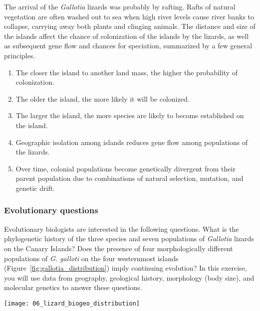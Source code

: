 \documentclass[12pt, hidelinks]{exam}
\begin{document}
The arrival of the \emph{Gallotia} lizards was probably by rafting. Rafts of natural vegetation are often
washed out to sea when high river levels cause river banks to collapse,
carrying away both plants and clinging animals. The distance and size of the islands affect the chance of colonization of the islands by the lizards, as well as subsequent gene flow and chances for speciation, summarized by a few general principles.

\begin{enumerate}

	\item The closer the island to another land mass, the higher the
probability of colonization.

	\item The older the island, the more likely it will be colonized.
	
	\item The larger the island, the more species are likely to become
established on the island.

	\item Geographic isolation among islands reduces gene flow among populations of the lizards.
	
	\item Over time, colonial populations become genetically divergent from
their parent population due to combinations of natural selection, mutation, and
genetic drift.

\end{enumerate} 

\subsubsection*{Evolutionary questions}

Evolutionary biologists are interested
in the following questions. What is the phylogenetic history of the three
species and seven populations of \emph{Gallotia} lizards on the Canary
Islands? Does the presence of four morphologically different populations
of \emph{G. galloti} on the four westernmost islands
(Figure~\ref{fig:gallotia_distribution}) imply continuing evolution? In this
exercise, you will use data from geography, geological history,
morphology (body size), and molecular genetics to answer
these questions.

\begin{center}

	\texttt{[image: 06\_lizard\_biogeo\_distribution]}
	

\end{center}
\end{document}
